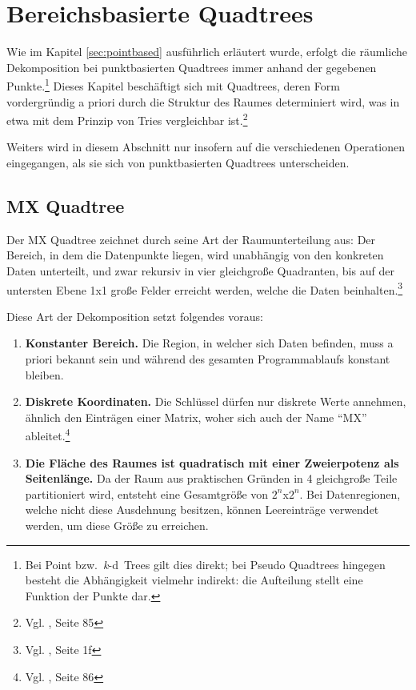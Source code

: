 \documentclass[%
			fontsize=12pt,%
			paper=a4,%
			DIV11,
			liststotoc,
			bibtotoc,
			draft=false,%
			titlepage
			]{scrartcl}
\newcommand{\zit}[3]{#1 \cite{#2}, #3}
\newcommand{\footzit}[3]{\footnote{\zit{#1}{#2}{#3}}}
\newcommand{\kd}{\mbox{\textit{k}-d}}
\begin{document}

\section{Bereichsbasierte Quadtrees}

Wie im Kapitel \ref{sec:pointbased} ausführlich erläutert wurde, erfolgt die räumliche Dekomposition bei punktbasierten Quadtrees immer anhand der gegebenen Punkte.\footnote{Bei Point bzw.\ \kd\ Trees gilt dies direkt; bei Pseudo Quadtrees hingegen besteht die Abhängigkeit vielmehr indirekt: die Aufteilung stellt eine Funktion der Punkte dar.}
Dieses Kapitel beschäftigt sich mit Quadtrees, deren Form vordergründig a priori durch die Struktur des Raumes determiniert wird, was in etwa mit dem Prinzip von Tries vergleichbar ist.\footzit{Vgl.}{Samet90}{Seite 85}

Weiters wird in diesem Abschnitt nur insofern auf die verschiedenen Operationen eingegangen, als sie sich von punktbasierten Quadtrees unterscheiden.

\subsection{MX Quadtree}
Der MX Quadtree zeichnet durch seine Art der Raumunterteilung aus:
Der Bereich, in dem die Datenpunkte liegen, wird unabhängig von den konkreten Daten unterteilt,
und zwar rekursiv in vier gleichgroße Quadranten, 
bis auf der untersten Ebene 1x1 große Felder erreicht werden, welche die Daten beinhalten.\footzit{Vgl.}{Samet:1985:SCP:282957.282966}{Seite 1f}

Diese Art der Dekomposition setzt folgendes voraus:
\renewcommand{\labelenumi}{({\theenumi})}
\begin{enumerate}
	\item \textbf{Konstanter Bereich.}
		Die Region, in welcher sich Daten befinden, muss a priori bekannt sein und während des gesamten Programmablaufs konstant bleiben.
	\item \textbf{Diskrete Koordinaten.}
		Die Schlüssel dürfen nur diskrete Werte annehmen, ähnlich den Einträgen einer Matrix, woher sich auch der Name "`MX"' ableitet.\footzit{Vgl.}{Samet90}{Seite 86}
	\item \textbf{Die Fläche des Raumes ist quadratisch mit einer Zweierpotenz als Seitenlänge.}
		Da der Raum aus praktischen Gründen in 4 gleichgroße Teile partitioniert wird, entsteht eine Gesamtgröße von $2^n$x$2^n$. Bei Datenregionen, welche nicht diese Ausdehnung besitzen, können Leereinträge verwendet werden, um diese Größe zu erreichen.
\end{enumerate}
\end{document}
